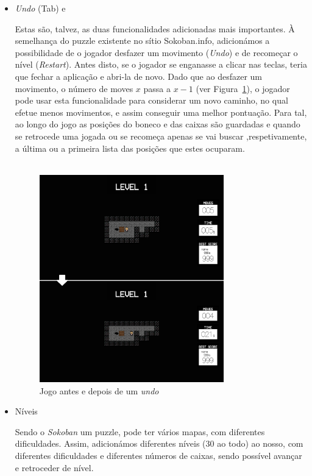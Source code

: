 \documentclass[a4paper]{article}
\begin{document}
\begin{itemize}
\item \emph{Undo} (Tab) e 

Estas são, talvez, as duas funcionalidades adicionadas mais importantes. À semelhança do puzzle existente no sítio Sokoban.info, adicionámos a possibilidade de o jogador desfazer um movimento (\emph{Undo}) e de recomeçar o nível (\emph{Restart}). Antes disto, se o jogador se enganasse a clicar nas teclas, teria que fechar a aplicação e abri-la de novo. Dado que ao desfazer um movimento, o número de moves $x$ passa a $x-1$ (ver Figura~\ref{fig:undo}), o jogador pode usar esta funcionalidade para considerar um novo caminho, no qual efetue menos movimentos, e assim conseguir uma melhor pontuação. Para  tal, ao longo do jogo as posições do boneco e das caixas são guardadas e quando se retrocede uma jogada ou se recomeça  apenas se vai buscar ,respetivamente, a última ou a primeira lista das posições que estes ocuparam. 
\\
\\
\begin{figure}[H]
\centering
\includegraphics[width=8cm]{undo.png}
\caption{Jogo antes e depois de um \emph{undo}}
\label{fig:undo}
\end{figure}

\smallskip
\item Níveis

Sendo o \emph{Sokoban} um puzzle, pode ter vários mapas, com diferentes dificuldades. Assim, adicionámos diferentes níveis (30 ao todo) ao nosso, com diferentes dificuldades e diferentes números de caixas, sendo possível avançar e retroceder de nível.


\end{itemize}
\end{document}
